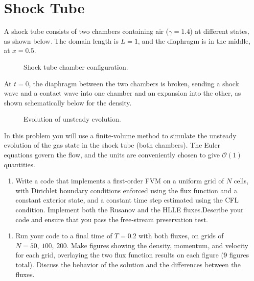 \pagebreak
\pagestyle{fancy}
\restoregeometry
\section{Shock Tube}
A shock tube consists of two chambers containing air ($\gamma = 1.4$) at different states, as shown below. The domain length is $L= 1$, and the diaphragm is in the middle, at $x= 0.5$.

\begin{figure}[h]
    \centering
    
    \caption{Shock tube chamber configuration.}
\end{figure}

At $t= 0$, the diaphragm between the two chambers is broken, sending a shock wave and a contact wave into one chamber and an expansion into the other, as shown schematically below for the density.

\begin{figure}[h]
    \centering
    
    \caption{Evolution of unsteady evolution.}
\end{figure}

In this problem you will use a finite-volume method to simulate the unsteady evolution of the gas state in the shock tube (both chambers). The Euler equations govern the flow, and the units are conveniently chosen to give $\mathcal{O}(1)$ quantities.

\begin{enumerate}[label=\alph*., start = 1]
    \item Write a code that implements a first-order FVM on a uniform grid of $N$ cells, with Dirichlet boundary conditions enforced using the flux function and a constant exterior state, and a constant time step estimated using the CFL condition. Implement both the Rusanov and the HLLE fluxes.Describe your code and ensure that you pass the free-stream preservation test.
\end{enumerate}

\begin{enumerate}[label=\alph*., start = 2]
    \item Run your code to a final time of $T= 0.2$ with both fluxes, on grids of $N= 50,\ 100,\ 200$.  Make figures  showing the density, momentum, and velocity for each grid, overlaying the two flux function results on each figure (9 figures total). Discuss the behavior of the solution and the differences between the fluxes.
\end{enumerate}